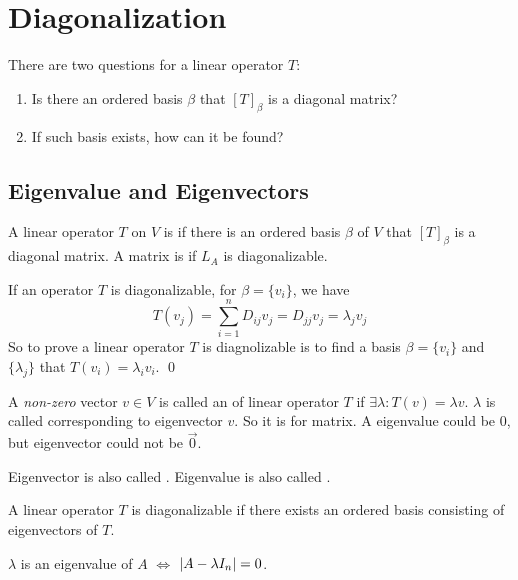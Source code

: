 \section{Diagonalization}


There are two questions for a linear operator $T$:
\begin{enumerate}
    \item Is there an ordered basis $\beta$ that $[T]_\beta$ is a diagonal matrix?
    \item If such basis exists, how can it be found?
\end{enumerate}


\subsection{Eigenvalue and Eigenvectors}

\begin{definition}
    A linear operator $T$ on $V$ is  if there is an ordered basis $\beta$ of $V$ that $[T]_\beta$ is a diagonal matrix. A matrix is  if $L_A$ is diagonalizable.


If an operator $T$ is diagonalizable, for $\beta = \{v_i\}$, we have
\begin{equation*}
    T(v_j) = \sum_{i=1}^n D_{ij} v_j = D_{jj} v_j = \lambda_j v_j
\end{equation*}
So to prove a  linear operator $T$ is diagnolizable is to find a basis $\beta = \{ v_i \}$ and $\{ \lambda_j \}$ that $T(v_i) = \lambda_i v_i$.
\qed
\end{definition}

\begin{definition}
    A \emph{non-zero} vector $v \in V$ is called an  of linear operator $T$ if $\exists \lambda : T(v) = \lambda v$. $\lambda$ is called  corresponding to eigenvector $v$. So it is for matrix. A eigenvalue could be $0$, but eigenvector could not be $\vec{0}$.
\end{definition}

Eigenvector is also called . Eigenvalue is also called .

\begin{theorem}
    A linear operator $T$ is diagonalizable if there exists an ordered basis consisting of eigenvectors of $T$.
\end{theorem}

\begin{theorem}
    $\lambda$ is an eigenvalue of $A$ $\iff$ $\displaystyle \left| \displaystyle A - \lambda I_n \right| = 0$.
\end{theorem}

